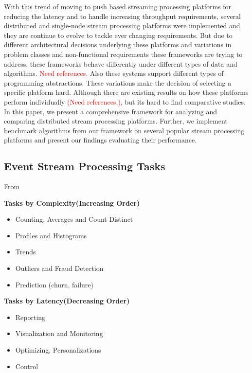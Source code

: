 \documentclass{sig-alternate}
\begin{document}
With this trend of moving to push based streaming processing platforms
for reducing the latency and to handle increasing throughput
requirements, several distributed and single-node stream processing
platforms were implemented and they are continue to evolve to tackle
ever changing requirements. But due to different architectural
decisions underlying these platforms and variations in problem classes and
non-functional requirements these frameworks are trying to address,
these frameworks behave differently under different types of data and
algorithms. \textcolor{Red}{Need references.} Also these systems
support different types of programming abstractions. These variations
make the decision of selecting a specific platform hard. Although
there are existing results on how these platforms perform
individually \textcolor{Red}{(Need references.)}, but its hard to find
comparative studies. In this paper, we present a comprehensive
framework for analyzing and comparing distributed stream processing
platforms. Further, we implement benchmark algorithms from our
 framework on several popular stream processing platforms and present
 our findings evaluating their performance.



 \subsection{Event Stream Processing Tasks}


From~\cite{streamdrill:presentation}

 \textbf{Tasks by Complexity(Increasing Order)}

 \begin{itemize}
  \item Counting, Averages and Count Distinct
  \item Profiles and Histograms
  \item Trends
  \item Outliers and Fraud Detection
  \item Prediction (churn, failure)
 \end{itemize}

\textbf{Tasks by Latency(Decreasing Order)}
\begin{itemize}
 \item Reporting
 \item Visualization and Monitoring
 \item Optimizing, Personalizations
 \item Control
\end{itemize}





\end{document}
